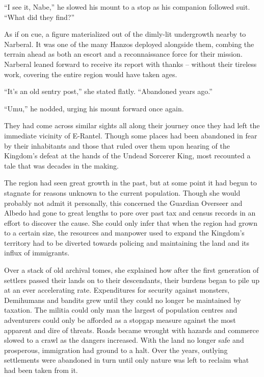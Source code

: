  

“I see it, Nabe,” he slowed his mount to a stop as his companion followed suit. “What did they find?”

 

As if on cue, a figure materialized out of the dimly-lit undergrowth nearby to Narberal. It was one of the many Hanzos deployed alongside them, combing the terrain ahead as both an escort and a reconnaissance force for their mission. Narberal leaned forward to receive its report with thanks – without their tireless work, covering the entire region would have taken ages.

 

“It’s an old sentry post,” she stated flatly. “Abandoned years ago.”

 

“Umu,” he nodded, urging his mount forward once again.

 

They had come across similar sights all along their journey once they had left the immediate vicinity of E-Rantel. Though some places had been abandoned in fear by their inhabitants and those that ruled over them upon hearing of the Kingdom’s defeat at the hands of the Undead Sorcerer King, most recounted a tale that was decades in the making.

 

The region had seen great growth in the past, but at some point it had begun to stagnate for reasons unknown to the current population. Though she would probably not admit it personally, this concerned the Guardian Overseer and Albedo had gone to great lengths to pore over past tax and census records in an effort to discover the cause. She could only infer that when the region had grown to a certain size, the resources and manpower used to expand the Kingdom’s territory had to be diverted towards policing and maintaining the land and its influx of immigrants.

 

Over a stack of old archival tomes, she explained how after the first generation of settlers passed their lands on to their descendants, their burdens began to pile up at an ever accelerating rate. Expenditures for security against monsters, Demihumans and bandits grew until they could no longer be maintained by taxation. The militia could only man the largest of population centres and adventurers could only be afforded as a stopgap measure against the most apparent and dire of threats. Roads became wrought with hazards and commerce slowed to a crawl as the dangers increased. With the land no longer safe and prosperous, immigration had ground to a halt. Over the years, outlying settlements were abandoned in turn until only nature was left to reclaim what had been taken from it.

